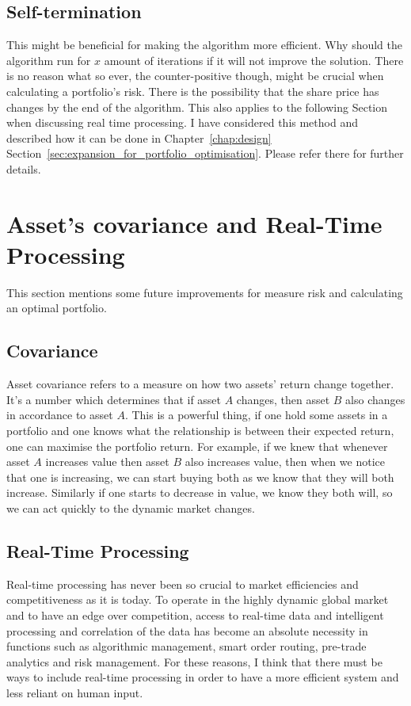     \subsection{Self-termination} %
    \label{sub:self_termination}
      This might be beneficial for making the algorithm more efficient. Why should the algorithm run for $x$ amount of iterations if it will not improve the solution. There is no reason what so ever, the counter-positive though, might be crucial when calculating a portfolio's risk. There is the possibility that the share price has changes by the end of the algorithm. This also applies to the following Section~ when discussing real time processing. I have considered this method and described how it can be done in Chapter~\ref{chap:design} Section~\ref{sec:expansion_for_portfolio_optimisation}. Please refer there for further details.

  \section{Asset's covariance and Real-Time Processing} %
  \label{sec:asset_s_covariance_and_real_time_processing}
  This section mentions some future improvements for measure risk and calculating an optimal portfolio.
    \subsection{Covariance} %
    \label{sub:covariance}
      Asset covariance refers to a measure on how two assets' return change together. It's a number which determines that if asset $A$ changes, then asset $B$ also changes in accordance to asset $A$. This is a powerful thing, if one hold some assets in a portfolio and one knows what the relationship is between their expected return, one can maximise the portfolio return. For example, if we knew that whenever asset $A$ increases value then asset $B$ also increases value, then when we notice that one is increasing, we can start buying both as we know that they will both increase. Similarly if one starts to decrease in value, we know they both will, so we can act quickly to the dynamic market changes. 
    \subsection{Real-Time Processing} %
    \label{sub:real_time_processing}
      Real-time processing has never been so crucial to market efficiencies and competitiveness as it is today. To operate in the highly dynamic global market and to have an edge over competition, access to real-time data and intelligent processing and correlation of the data has become an absolute necessity in functions such as algorithmic management, smart order routing, pre-trade analytics and risk management. For these reasons, I think that there must be ways to include real-time processing in order to have a more efficient system and less reliant on human input. 

